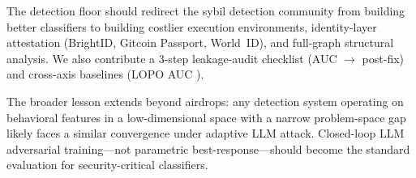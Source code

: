 \documentclass[sigconf,nonacm=false]{acmart}
\begin{document}
The detection floor should redirect the sybil detection community from building better classifiers to building costlier execution environments, identity-layer attestation (BrightID, Gitcoin Passport, World~ID), and full-graph structural analysis. We also contribute a 3-step leakage-audit checklist (AUC \leakageFixLeakyAuc{}$\to$\leakageFixHonestAuc{} post-fix) and cross-axis baselines (LOPO AUC \largeScaleCrossAxisGbmMeanAuc{}).

The broader lesson extends beyond airdrops: any detection system operating on behavioral features in a low-dimensional space with a narrow problem-space gap likely faces a similar convergence under adaptive LLM attack. Closed-loop LLM adversarial training---not parametric best-response---should become the standard evaluation for security-critical classifiers.




\end{document}
